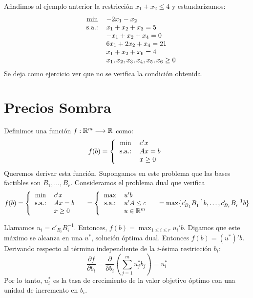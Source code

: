 \documentclass[PM.tex]{subfiles}
\begin{document}
\begin{example}
Añadimos al ejemplo anterior la restricción $x_1+x_2\leq 4$ y estandarizamos:
\[\begin{tabular}{c c l}
	& $\min$ & $-2x_1-x_2$\\
	& s.a.: & $x_1+x_2 +x_3 = 5$\\
	& & $-x_1+x_2 +x_4 =0$\\
	& & $6x_1+2x_2  +x_4 = 21$\\
	& & $x_1+x_2 +x_6 = 4$\\
    & & $x_1,x_2,x_3,x_4,x_5,x_6 \geq 0$
\end{tabular}\]
Se deja como ejercicio ver que no se verifica la condición obtenida.
\end{example}

\section{Precios Sombra}
Definimos una función $f: \mathbb{R}^m \longrightarrow \mathbb{R}$ como:
\[
 f(b) = \left\{\begin{tabular}{c l}
 $\min$ & $c'x$\\
 s.a.: & $Ax=b$\\
 & $x\geq 0$
 \end{tabular}
 \right.
\]
Queremos derivar esta función. Supongamos en este problema que las bases factibles son $B_1,\dots, B_r$. Consideramos el problema dual que verifica
\[
 f(b) = \left\{
 \begin{tabular}{cl}
 $\min$ & $c'x$\\
 s.a.: & $Ax=b$\\
 & $x \geq 0$
 \end{tabular}
 \right.
 \quad = \left\{
 \begin{tabular}{cl}
 $\max$ & $u'b$\\
 s.a.: & $u'A\leq c$\\
 & $u \in \R^m$
 \end{tabular}
 \right.
 \quad = \max\{c'_{B_1}B_1^{-1}b,\dots, c'_{B_r}B_r^{-1}b\}
\]

Llamamos $u_i=c'_{B_i}B_i^{-1}$. Entonces, $f(b)=\max_{1\leq i\leq r}u_i'b$. Digamos que este máximo se alcanza en una $u^*$, solución óptima dual.
Entonces $f(b)=(u^*)' b$. Derivando respecto al término independiente de la $i$-ésima restricción $b_i$:
\[\frac{\partial f}{\partial b_i}=\frac{\partial }{\partial b_i}\left(\sum_{j=1}^m u^*_jb_j\right)=u^*_i\]
Por lo tanto, $u^*_i$ es la tasa de crecimiento de la valor objetivo óptimo con una unidad de incremento en $b_i$.
\end{document}
